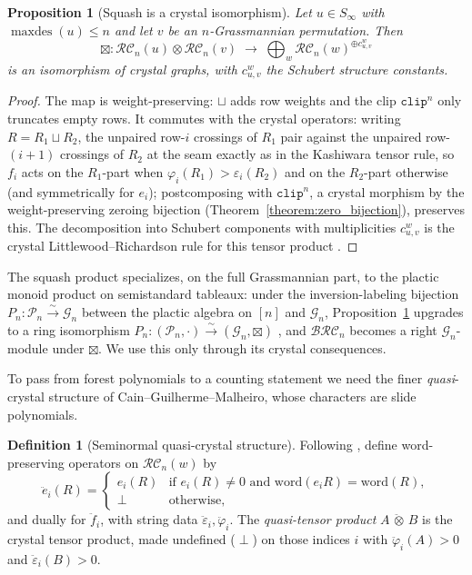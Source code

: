 \documentclass{amsart}
\newtheorem{proposition}[theorem]{Proposition}
\theoremstyle{definition}
\newtheorem{definition}[theorem]{Definition}
\theoremstyle{remark}
\newcommand{\BRC}{\mathcal{BRC}}
\newcommand{\RC}{\mathcal{RC}}
\newcommand{\grass}{\mathcal{G}}
\newcommand{\plac}{\mathcal{P}}
\newcommand{\maxd}{\operatorname{maxdes}}
\newcommand{\clp}{\mathtt{clip}}
\begin{document}
\begin{proposition}[Squash is a crystal isomorphism]\label{proposition:boxproduct}
Let $u\in S_\infty$ with $\maxd(u)\leq n$ and let $v$ be an $n$-Grassmannian permutation. Then
\[
\boxtimes:\RC_n(u)\otimes\RC_n(v)\;\longrightarrow\;\bigoplus_{w}\RC_n(w)^{\oplus c_{u,v}^w}
\]
is an isomorphism of crystal graphs, with $c_{u,v}^w$ the Schubert structure constants.
\end{proposition}
\begin{proof}
The map is weight-preserving: $\sqcup$ adds row weights and the clip $\clp^{n}$ only truncates empty rows. It commutes with the crystal operators: writing $R=R_1\sqcup R_2$, the unpaired row-$i$ crossings of $R_1$ pair against the unpaired row-$(i+1)$ crossings of $R_2$ at the seam exactly as in the Kashiwara tensor rule, so $f_i$ acts on the $R_1$-part when $\varphi_i(R_1)>\varepsilon_i(R_2)$ and on the $R_2$-part otherwise (and symmetrically for $e_i$); postcomposing with $\clp^{n}$, a crystal morphism by the weight-preserving zeroing bijection (Theorem~\ref{theorem:zero_bijection}), preserves this. The decomposition into Schubert components with multiplicities $c_{u,v}^w$ is the crystal Littlewood--Richardson rule for this tensor product \cite{kouno2020decomposition}.
\end{proof}

The squash product specializes, on the full Grassmannian part, to the plactic monoid product on semistandard tableaux: under the inversion-labeling bijection $P_n:\plac_n\xrightarrow{\sim}\grass_n$ between the plactic algebra on $[n]$ and $\grass_n$, Proposition~\ref{proposition:boxproduct} upgrades to a ring isomorphism $P_n:(\plac_n,\cdot)\xrightarrow{\sim}(\grass_n,\boxtimes)$ \cite{kashiwara1993crystal,littelmann1995crystal,axelrodfreed2025inversionstableaux}, and $\BRC_n$ becomes a right $\grass_n$-module under $\boxtimes$. We use this only through its crystal consequences.

To pass from forest polynomials to a counting statement we need the finer \emph{quasi}-crystal structure of Cain--Guilherme--Malheiro, whose characters are slide polynomials.

\begin{definition}[Seminormal quasi-crystal structure]\label{definition:quasicrystal}
Following \cite{cain2023quasicrystals}, define word-preserving operators on $\RC_n(w)$ by
\[
\ddot e_i(R)=\begin{cases}e_i(R)&\text{if }e_i(R)\neq 0\text{ and }\mathrm{word}(e_iR)=\mathrm{word}(R),\\ \perp&\text{otherwise,}\end{cases}
\]
and dually for $\ddot f_i$, with string data $\ddot\varepsilon_i,\ddot\varphi_i$. The \emph{quasi-tensor product} $A\,\ddot\otimes\,B$ is the crystal tensor product, made undefined ($\perp$) on those indices $i$ with $\ddot\varphi_i(A)>0$ and $\ddot\varepsilon_i(B)>0$.
\end{definition}
\end{document}
